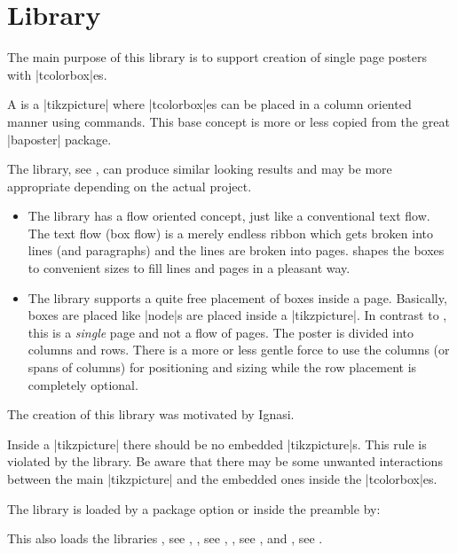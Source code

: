 \clearpage
\section{Library }\label{sec:poster}%
%

The main purpose of this library is to support creation of single page posters
with |tcolorbox|es.

A  is a |tikzpicture| where |tcolorbox|es can be
placed in a column oriented manner using  commands.
This base concept is more or less copied from the great |baposter| package.

The  library, see , can produce
similar looking results and may be more appropriate
depending on the actual project.
\begin{itemize}
\item The  library has a flow oriented concept, just like a
  conventional text flow. The text flow (box flow) is a merely endless ribbon
  which gets broken into lines (and paragraphs) and the lines are broken
  into pages.  shapes the boxes to convenient sizes to fill
  lines and pages in a pleasant way.
\item The  library supports a quite free placement of
  boxes inside a page.
  Basically, boxes are placed like |node|s are placed inside a |tikzpicture|.
  In contrast to , this is a \emph{single} page
  and not a flow of pages.
  The poster is divided into columns and rows.
  There is a more or less gentle force to use the columns (or spans of columns)
  for positioning and sizing while the row placement is completely optional.
\end{itemize}
The creation of this library was motivated by Ignasi.

\begin{marker}
Inside a |tikzpicture| there should be no embedded |tikzpicture|s.
This rule is violated by the  library. Be aware that there
may be some unwanted interactions between the main |tikzpicture| and
the embedded ones inside the |tcolorbox|es.
\end{marker}

The library is loaded by a package option or inside the preamble by:
\begin{dispListing}
\end{dispListing}
This also loads the libraries
, see ,
, see ,
, see , and
, see .


